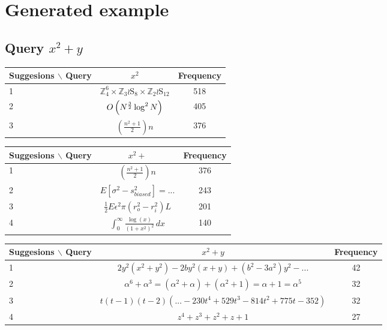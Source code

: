 \documentclass[12pt]{article} %
\begin{document}
\section*{Generated example}

\subsection{Query $x^2+y$}
\begin{center}
\begin{tabular}{lcc}
Suggesions $\backslash$ Query  & $x^2 $ & Frequency\\
\hline
 1 &  $ \mathbb{Z}_{4}^{6}\times\mathbb{Z}_{3}\wr\mathrm{S}_{8}\times\mathbb{Z}_{2}\wr\mathrm{S}_{12} $
   & 518 \\
 2 &  $ O\left(N^{3\over 2}\log^{2}N\right) $
   & 405 \\
 3 &  $  \left(\frac{n^{2}+1}{2}\right)n $
   & 376 \\
\end{tabular}
\end{center}

\begin{center}
\begin{tabular}{lcc}
Suggesions $\backslash$ Query  & $x^2+ $ & Frequency\\
\hline
 1 &  $\left(\frac{n^{2}+1}{2}\right)n$
   & 376 \\
 2 &  $ \displaystyle E\left[\sigma^{2}-s_{biased}^{2}\right]\displaystyle=...$
   & 243 \\
 3 &  $  \frac{1}{2}E\epsilon^{2}\pi(r_{o}^{2}-r_{i}^{2})L $
   & 201 \\
 4 &  $  \int_{0}^{\infty}\frac{\log(x)}{(1+x^{2})^{2}}\,dx $
   & 140 \\
\end{tabular}
\end{center}

\begin{center}
\begin{tabular}{lcc}
Suggesions $\backslash$ Query  & $x^2+ y$ & Frequency\\
\hline
 1 &  $ 2y^{2}(x^{2}+y^{2})-2by^{2}(x+y)+(b^{2}-3a^{2})y^{2}- ...$
   & 42 \\
 2 &  $ \alpha^{6}+\alpha^{3}=(\alpha^{2}+\alpha)+(\alpha^{2}+1)=\alpha+1=\alpha^{5} $
   & 32 \\
 3 &  $  t(t-1)(t-2)(... - 230t^{4}+529t^{3}-814t^{2}+775t-352) $
   & 32 \\
 4 &  $   z^{4}+z^{3}+z^{2}+z+1 $
   & 27 \\
\end{tabular}
\end{center}
\end{document}
